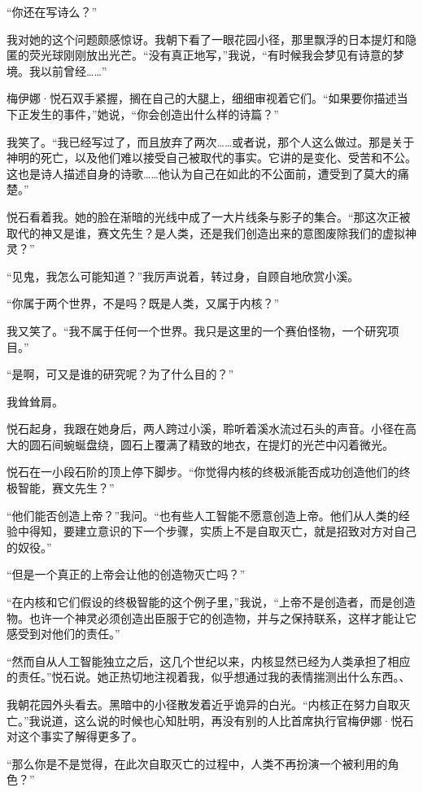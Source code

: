 \documentclass[AutoFakeBold=true]{book}
\begin{document}
``你还在写诗么？''

我对她的这个问题颇感惊讶。我朝下看了一眼花园小径，那里飘浮的日本提灯和隐匿的荧光球刚刚放出光芒。``没有真正地写，''我说，``有时候我会梦见有诗意的梦境。我以前曾经……''

梅伊娜·悦石双手紧握，搁在自己的大腿上，细细审视着它们。``如果要你描述当下正发生的事件，''她说，``你会创造出什么样的诗篇？''

我笑了。``我已经写过了，而且放弃了两次……或者说，那个人这么做过。那是关于神明的死亡，以及他们难以接受自己被取代的事实。它讲的是变化、受苦和不公。这也是诗人描述自身的诗歌……他认为自己在如此的不公面前，遭受到了莫大的痛楚。''

悦石看着我。她的脸在渐暗的光线中成了一大片线条与影子的集合。``那这次正被取代的神又是谁，赛文先生？是人类，还是我们创造出来的意图废除我们的虚拟神灵？''

``见鬼，我怎么可能知道？''我厉声说着，转过身，自顾自地欣赏小溪。

``你属于两个世界，不是吗？既是人类，又属于内核？''

我又笑了。``我不属于任何一个世界。我只是这里的一个赛伯怪物，一个研究项目。''

``是啊，可又是谁的研究呢？为了什么目的？''

我耸耸肩。

悦石起身，我跟在她身后，两人跨过小溪，聆听着溪水流过石头的声音。小径在高大的圆石间蜿蜒盘绕，圆石上覆满了精致的地衣，在提灯的光芒中闪着微光。

悦石在一小段石阶的顶上停下脚步。``你觉得内核的终极派能否成功创造他们的终极智能，赛文先生？''

``他们能否创造上帝？''我问。``也有些人工智能不愿意创造上帝。他们从人类的经验中得知，要建立意识的下一个步骤，实质上不是自取灭亡，就是招致对方对自己的奴役。''

``但是一个真正的上帝会让他的创造物灭亡吗？''

``在内核和它们假设的终极智能的这个例子里，''我说，``上帝不是创造者，而是创造物。也许一个神灵必须创造出臣服于它的创造物，并与之保持联系，这样才能让它感受到对他们的责任。''

``然而自从人工智能独立之后，这几个世纪以来，内核显然已经为人类承担了相应的责任。''悦石说。她正热切地注视着我，似乎想通过我的表情揣测出什么东西。、

我朝花园外头看去。黑暗中的小径散发着近乎诡异的白光。``内核正在努力自取灭亡。''我说道，这么说的时候也心知肚明，再没有别的人比首席执行官梅伊娜·悦石对这个事实了解得更多了。

``那么你是不是觉得，在此次自取灭亡的过程中，人类不再扮演一个被利用的角色？''
\end{document}
